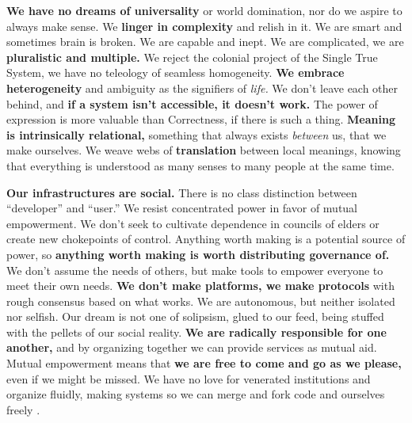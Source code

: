 \documentclass{article}
\begin{document}
\textbf{We have no dreams of universality} or world domination, nor do
we aspire to always make sense. We \textbf{linger in complexity} and
relish in it. We are smart and sometimes brain is broken. We are capable
and inept. We are complicated, we are \textbf{pluralistic and multiple.}
We reject the colonial project of the Single True System, we have no
teleology of seamless homogeneity. \textbf{We embrace heterogeneity} and
ambiguity as the signifiers of \emph{life.} We don't leave each other
behind, and \textbf{if a system isn't accessible, it doesn't work.} The
power of expression is more valuable than Correctness, if there is such
a thing. \textbf{Meaning is intrinsically relational,} something that
always exists \emph{between} us, that we make ourselves. We weave webs
of \textbf{translation} between local meanings, knowing that everything
is understood as many senses to many people at the same time.

\textbf{Our infrastructures are social.} There is no class distinction
between ``developer'' and ``user.'' We resist concentrated power in
favor of mutual empowerment. We don't seek to cultivate dependence in
councils of elders or create new chokepoints of control. Anything worth
making is a potential source of power, so \textbf{anything worth making
is worth distributing governance of.} We don't assume the needs of
others, but make tools to empower everyone to meet their own needs.
\textbf{We don't make platforms, we make protocols} with rough consensus
based on what works. We are autonomous, but neither isolated nor
selfish. Our dream is not one of solipsism, glued to our feed, being
stuffed with the pellets of our social reality. \textbf{We are radically
responsible for one another,} and by organizing together we can provide
services as mutual aid. Mutual empowerment means that \textbf{we are
free to come and go as we please,} even if we might be missed. We have
no love for venerated institutions and organize fluidly, making systems
so we can merge and fork code and
ourselves freely \cite{bookchinNoteAffinityGroups1969, MeatballWikiRightToFork} .
\end{document}
